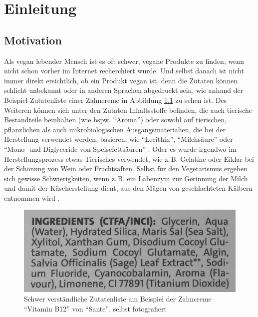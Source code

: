 \clearpage
\pagestyle{headings}
\setcounter{page}{1}

\chapter{Einleitung}
\label{chap:introduction}

\section{Motivation}
\label{sec:motivation}

Als vegan lebender Mensch ist es oft schwer, vegane
Produkte zu finden, wenn nicht schon vorher im Internet recherchiert
wurde.
Und selbst danach ist nicht immer direkt ersichtlich, ob ein
Produkt vegan ist, denn die Zutaten können schlicht unbekannt
oder in anderen Sprachen abgedruckt sein, wie anhand der
Beispiel-Zutatenliste einer Zahncreme in Abbildung
\ref{img:ingredient_list} zu sehen ist.
Des Weiteren können sich unter den
Zutaten Inhaltsstoffe befinden, die auch tierische
Bestandteile beinhalten (wie bspw. "`Aroma"') oder sowohl auf tierischen,
pflanzlichen als
auch mikrobiologischen Ausgangsmaterialien, die bei der Herstellung
verwendet werden, basieren, wie "`Lecithin"', "`Milchsäure"'
oder "`Mono- und Diglyceride von Speisefettsäuren"'
.
Oder es
wurde irgendwo im Herstellungsprozess etwas Tierisches verwendet, wie
z.\,B. Gelatine oder Eiklar bei der Schönung von Wein oder
Fruchtsäften.
Selbst für den Vegetarismus ergeben sich gewisse Schwierigkeiten, wenn
z.\,B. ein Labenzym zur Gerinnung der Milch und damit der
Käseherstellung dient, aus den Mägen von geschlachteten Kälbern
entnommen wird \cite[S. 75]{bre05}.

\begin{figure}[ht]
	\centering
	\includegraphics[scale=0.2]{pics/ingredient_list.jpg}
	\caption[Schwer verständliche Zutatenliste
	am Beispiel der Zahncreme "`Vitamin B12"' von "`Sante"']{Schwer verständliche Zutatenliste
	am Beispiel
	der Zahncreme "`Vitamin B12"' von "`Sante"', selbst fotografiert}
	\label{img:ingredient_list}
\end{figure}

